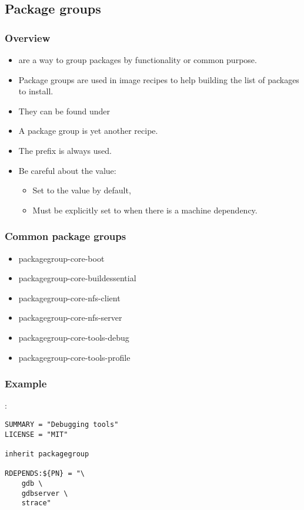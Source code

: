 \subsection{Package groups}

\begin{frame}
  \frametitle{Overview}
  \begin{itemize}
    \item {} are a way to group packages by
      functionality or common purpose.
    \item Package groups are used in image recipes to help building
      the list of packages to install.
    \item They can be found under
    \item A package group is yet another recipe.
    \item The prefix  is always used.
    \item Be careful about the  value:
      \begin{itemize}
      \item Set to the value  by default,
      \item Must be explicitly set to  when there is a machine
        dependency.
      \end{itemize}
  \end{itemize}
\end{frame}

\begin{frame}
  \frametitle{Common package groups}
  \begin{itemize}
    \item packagegroup-core-boot
    \item packagegroup-core-buildessential
    \item packagegroup-core-nfs-client
    \item packagegroup-core-nfs-server
    \item packagegroup-core-tools-debug
    \item packagegroup-core-tools-profile
  \end{itemize}
\end{frame}

\begin{frame}[fragile]
  \frametitle{Example}
  :
  \begin{block}{}
    \begin{verbatim}
SUMMARY = "Debugging tools"
LICENSE = "MIT"

inherit packagegroup

RDEPENDS:${PN} = "\
    gdb \
    gdbserver \
    strace"
    \end{verbatim}
  \end{block}
\end{frame}
